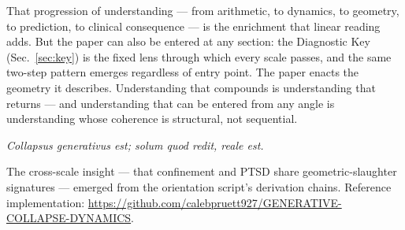 \documentclass[
  aps,
  prd,
  twocolumn,
  superscriptaddress,
  nofootinbib,
  floatfix
]{revtex4-2}
\begin{document}
That progression of understanding --- from arithmetic, to
dynamics, to geometry, to prediction, to clinical
consequence --- is the enrichment that linear reading adds.
But the paper can also be entered at any section: the
Diagnostic Key (Sec.~\ref{sec:key}) is the fixed lens
through which every scale passes, and the same two-step
pattern emerges regardless of entry point.  The paper enacts
the geometry it describes.  Understanding that compounds is
understanding that returns --- and understanding that can
be entered from any angle is understanding whose coherence
is structural, not sequential.

\emph{Collapsus generativus est; solum quod redit, reale est.}

\begin{acknowledgments}
The cross-scale insight --- that confinement and PTSD share
geometric-slaughter signatures --- emerged from the
orientation script's derivation chains.  Reference
implementation:
\url{https://github.com/calebpruett927/GENERATIVE-COLLAPSE-DYNAMICS}.
\end{acknowledgments}


\end{document}
